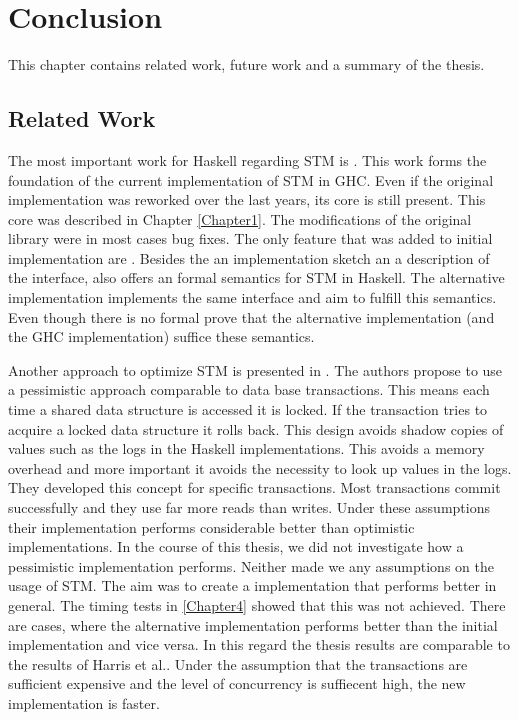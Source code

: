 \chapter{Conclusion}

\label{Chapter5}

This chapter contains related work, future work and a summary of the thesis.

\section{Related Work}
The most important work for Haskell regarding STM is \parencite{STMBase}. This work forms the foundation 
of the current implementation of STM in GHC. Even if the original implementation was reworked over the 
last years, its core is still present. This core was described in Chapter \ref{Chapter1}. The modifications
of the original library were in most cases bug fixes. The only feature that was added to initial
implementation are  \parencite{invariants}. Besides the an implementation sketch
an a description of the interface, \parencite{STMBase} also offers an formal semantics for STM in Haskell.
The alternative implementation implements the same interface and aim to fulfill this
semantics. Even though there is no formal prove that the alternative implementation (and the GHC implementation) 
suffice these semantics. 

Another approach to optimize STM is presented in \parencite{pessimisticSTM}. The authors propose to 
use a pessimistic approach comparable to data base transactions. This means each time a shared data structure 
is accessed it is locked. If the transaction tries to acquire a locked data structure it rolls back. 
This design avoids shadow copies of values such as the logs in the Haskell implementations. This avoids 
a memory overhead and more important it avoids the necessity to look up values in the logs. They developed 
this concept for specific transactions. Most transactions commit successfully and they use far more reads
than writes. Under these assumptions their implementation performs considerable better than optimistic 
implementations. In the course of this thesis, we did not investigate how a pessimistic implementation 
performs. Neither made we any assumptions on the usage of STM. The aim was to create a implementation
that performs better in general. The timing tests in \ref{Chapter4} showed that this was not achieved. 
There are cases, where the alternative implementation performs better than the initial implementation
and vice versa. In this regard the thesis results are comparable to the results of Harris et al.. 
Under the assumption that the transactions are sufficient expensive and the level of concurrency is 
suffiecent high, the new implementation is faster. 


